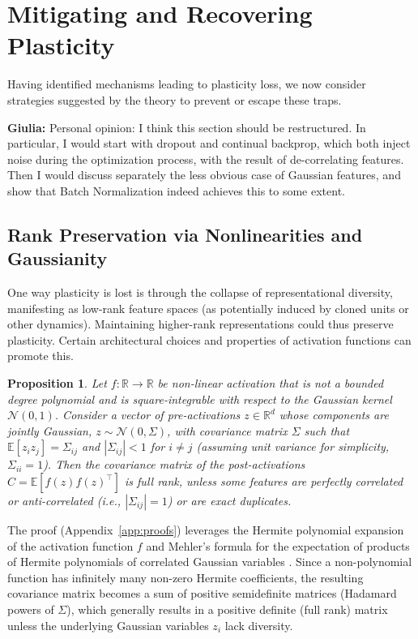 \documentclass{article}
\newcommand{\R}{\mathbb{R}}
\newcommand{\E}{\mathbb{E}}
\newcommand{\giulia}[1]{{\color{ForestGreen}\textbf{Giulia:} #1}}
\newtheorem{proposition}{Proposition}[section]
\begin{document}
\section{Mitigating and Recovering Plasticity}
\label{sec:mitigate}

Having identified mechanisms leading to plasticity loss, we now consider strategies suggested by the theory to prevent or escape these traps.

\giulia{Personal opinion: I think this section should be restructured. In particular, I would start with dropout and continual backprop, which both inject noise during the optimization process, with the result of de-correlating features. Then I would discuss separately the less obvious case of Gaussian features, and show that Batch Normalization indeed achieves this to some extent.}

\subsection{Rank Preservation via Nonlinearities and Gaussianity}

One way plasticity is lost is through the collapse of representational diversity, manifesting as low-rank feature spaces (as potentially induced by cloned units or other dynamics). Maintaining higher-rank representations could thus preserve plasticity. Certain architectural choices and properties of activation functions can promote this.

\begin{proposition}
\label{prop:rank}
Let $f:\R\to\R$ be non-linear activation that is not a bounded degree polynomial and is square-integrable with respect to the Gaussian kernel $\mathcal{N}(0,1)$. Consider a vector of pre-activations $z\in\R^d$ whose components are jointly Gaussian, $z \sim \mathcal{N}(0, \Sigma)$, with covariance matrix $\Sigma$ such that $\E[z_i z_j]=\Sigma_{ij}$ and $|\Sigma_{ij}|<1$ for $i \neq j$ (assuming unit variance for simplicity, $\Sigma_{ii}=1$). Then the covariance matrix of the post-activations $C = \E[f(z)f(z)^\top]$ is full rank, unless some features are perfectly correlated or anti-correlated (i.e., $|\Sigma_{ij}|=1$) or are exact duplicates.
\end{proposition}

The proof (Appendix~\ref{app:proofs}) leverages the Hermite polynomial expansion of the activation function $f$ \cite{erdelyi1953higher} and Mehler's formula for the expectation of products of Hermite polynomials of correlated Gaussian variables \cite{mehler1866ueber, erdelyi1953higher}. Since a non-polynomial function has infinitely many non-zero Hermite coefficients, the resulting covariance matrix becomes a sum of positive semidefinite matrices (Hadamard powers of $\Sigma$), which generally results in a positive definite (full rank) matrix unless the underlying Gaussian variables $z_i$ lack diversity.
\end{document}
